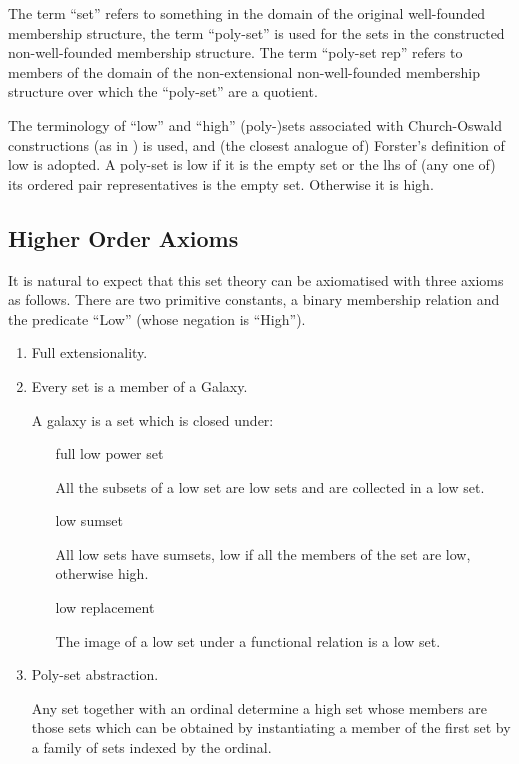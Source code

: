 \documentclass[numreferences]{rbjk}
\begin{document}
\begin{article}
The term ``set'' refers to something in the domain of the original well-founded membership structure, the term ``poly-set'' is used for the sets in the constructed non-well-founded membership structure.
The term ``poly-set rep'' refers to members of the domain of the non-extensional non-well-founded membership structure over which the ``poly-set'' are a quotient. 

The terminology of ``low'' and ``high'' (poly-)sets associated with Church-Oswald constructions (as in \cite{forster92,forster2005}) is used, and (the closest analogue of) Forster's definition of low is adopted.
A poly-set is low if it is the empty set or the lhs of (any one of) its ordered pair representatives is the empty set.
Otherwise it is high.

\subsection{Higher Order Axioms}

It is natural to expect that this set theory can be axiomatised with three axioms as follows.
There are two primitive constants, a binary membership relation and the predicate ``Low'' (whose negation is ``High'').

\begin{enumerate}
\item Full extensionality.

\item Every set is a member of a Galaxy.

A galaxy is a set which is closed under:

\begin{itemize}
\item [full low power set]\ 

All the subsets of a low set are low sets and are collected in a low set.

\item [low sumset]\ 

All low sets have sumsets, low if all the members of the set are low, otherwise high.

\item [low replacement]\ 

The image of a low set under a functional relation is a low set.

\end{itemize}

\item Poly-set abstraction.

Any set together with an ordinal determine a high set whose members are those sets which can be obtained by instantiating a member of the first set by a family of sets indexed by the ordinal.


\end{enumerate}
\end{article}
\end{document}
